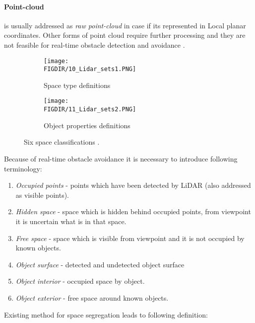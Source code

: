 \paragraph{Point-cloud} is usually addressed as \textit{raw point-cloud} in case if its represented in Local planar coordinates. Other forms of point cloud require further processing and they are not feasible for real-time obstacle detection and avoidance \cite{chen2007airborne}.

\begin{figure}[H]
    
    \begin{subfigure}{0.5\textwidth}
        \centering
        \texttt{[image: \\FIGDIR/10\_Lidar\_sets1.PNG]} 
        \caption{Space type definitions}
        \label{fig:Spacetypes}
    \end{subfigure}
    \begin{subfigure}{0.5\textwidth}
        \centering
        \texttt{[image: \\FIGDIR/11\_Lidar\_sets2.PNG]}
        \caption{Object properties definitions}
        \label{fig:ObectProperties}
    \end{subfigure}
    
    \caption{Six space classifications \cite{yapo2008probabilistic}.}
    \label{fig:Spaces of interests}
 \end{figure}
 
\noindent  Because of real-time obstacle avoidance it is necessary to introduce following terminology:
\begin{enumerate}
    \item \textit{Occupied points} - points which have been detected by LiDAR (also addressed as visible points).
    \item \textit{Hidden space} - space which is hidden behind occupied points, from viewpoint it is uncertain what is in that space. 
    \item \textit{Free space} - space which is visible from viewpoint and it is not occupied by known objects.
    \item \textit{Object surface} - detected and undetected object surface
    \item \textit{Object interior} - occupied space by object.
    \item \textit{Object exterior} - free space around known objects.
\end{enumerate}

\noindent Existing method for space segregation \cite{yapo2008probabilistic} leads to following definition:

